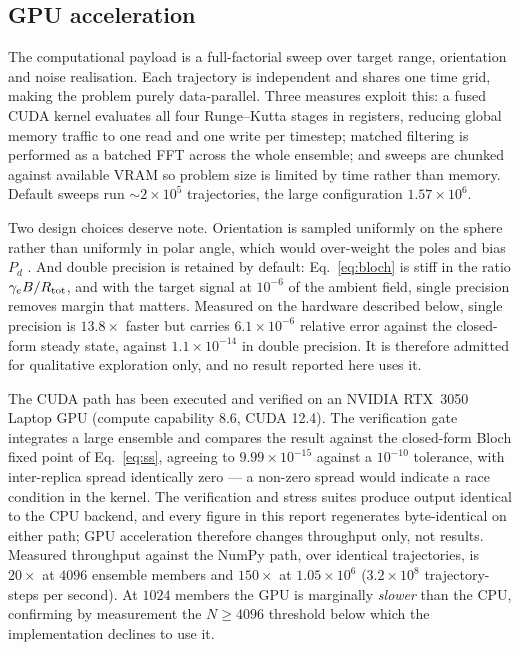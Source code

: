 \documentclass[11pt]{article}
\begin{document}
\subsection{GPU acceleration}
The computational payload is a full-factorial sweep over target range,
orientation and noise realisation. Each trajectory is independent and shares one
time grid, making the problem purely data-parallel. Three measures exploit this:
a fused CUDA kernel evaluates all four Runge--Kutta stages \cite{butcher2016} in
registers, reducing global memory traffic to one read and one write per timestep;
matched filtering is performed as a batched FFT across the whole ensemble;
and sweeps are chunked against available VRAM so problem size is limited by time
rather than memory. Default sweeps run $\sim2\times10^{5}$ trajectories, the
large configuration $1.57\times10^{6}$.

Two design choices deserve note. Orientation is sampled uniformly on the sphere
rather than uniformly in polar angle, which would over-weight the poles and bias
$P_d$ \cite{marsaglia1972}. And double precision is retained by default:
Eq.~\eqref{eq:bloch} is stiff in the ratio $\gamma_eB/R_{\rm tot}$, and with the
target signal at $10^{-6}$ of the ambient field, single precision removes margin
that matters. Measured on the hardware described below, single precision is
$13.8\times$ faster but carries $6.1\times10^{-6}$ relative error against the
closed-form steady state, against $1.1\times10^{-14}$ in double precision. It is
therefore admitted for qualitative exploration only, and no result reported here
uses it.

The CUDA path has been executed and verified on an NVIDIA RTX~3050 Laptop GPU
(compute capability 8.6, CUDA 12.4). The verification gate integrates a large
ensemble and compares the result against the closed-form Bloch fixed point of
Eq.~\eqref{eq:ss}, agreeing to $9.99\times10^{-15}$ against a $10^{-10}$
tolerance, with inter-replica spread identically zero --- a non-zero spread would
indicate a race condition in the kernel. The verification and stress suites
produce output identical to the CPU backend, and every figure in this report
regenerates byte-identical on either path; GPU acceleration therefore changes
throughput only, not results. Measured throughput against the NumPy path, over
identical trajectories, is $20\times$ at $4096$ ensemble members and $150\times$
at $1.05\times10^{6}$ ($3.2\times10^{8}$ trajectory-steps per second). At $1024$
members the GPU is marginally \emph{slower} than the CPU, confirming by
measurement the $N\geq4096$ threshold below which the implementation declines to
use it.
\end{document}
